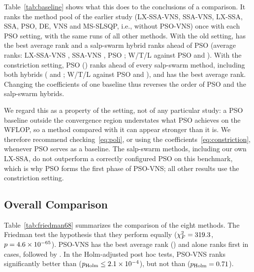 Table~\ref{tab:baseline} shows what this does to the conclusions of a comparison. It ranks the method pool of the earlier study (LX-SSA-VNS, SSA-VNS, LX-SSA, SSA, PSO, DE, VNS and MS-SLSQP, i.e., without PSO-VNS) once with each PSO setting, with the same runs of all other methods. With the old setting, \NBaseOldBest{} has the best average rank and a salp-swarm hybrid ranks ahead of PSO (average ranks: LX-SSA-VNS \NBaseOldLXBVRank, SSA-VNS \NBaseOldSSAVNSRank, PSO \NBaseOldPSORank; W/T/L against PSO \NBaseOldLXBVvsPSO{} and \NBaseOldSSAVNSvsPSO). With the constriction setting, PSO (\NBaseNewPSORank) ranks ahead of every salp-swarm method, including both hybrids (\NBaseNewLXBVRank{} and \NBaseNewSSAVNSRank; W/T/L against PSO \NBaseNewLXBVvsPSO{} and \NBaseNewSSAVNSvsPSO), and \NBaseNewBest{} has the best average rank. Changing the coefficients of one baseline thus reverses the order of PSO and the salp-swarm hybrids.

We regard this as a property of the setting, not of any particular study: a PSO baseline outside the convergence region understates what PSO achieves on the WFLOP, so a method compared with it can appear stronger than it is. We therefore recommend checking~\eqref{eq:poli}, or using the coefficients~\eqref{eq:constriction}, whenever PSO serves as a baseline. The salp-swarm methods, including our own LX-SSA, do not outperform a correctly configured PSO on this benchmark, which is why PSO forms the first phase of PSO-VNS; all other results use the constriction setting.

\subsection{Overall Comparison}
\label{sec:overall}



Table~\ref{tab:friedman68} summarizes the comparison of the eight methods. The Friedman test \NFriedVerb{} the hypothesis that they perform equally ($\chi^2_F=319.3$, $p=4.6\times10^{-65}$). PSO-VNS has the best average rank (\NRankPSOVNS) and alone ranks first in \NSoleBestPSOVNS{} cases, followed by \NRankOrderOthers. In the Holm-adjusted post hoc tests, PSO-VNS ranks significantly better than \NPostHocSigList{} ($p_{\rm Holm}\le2.1\times10^{-4}$), but not than \NPostHocNonSigList{} ($p_{\rm Holm}=0.71$).


